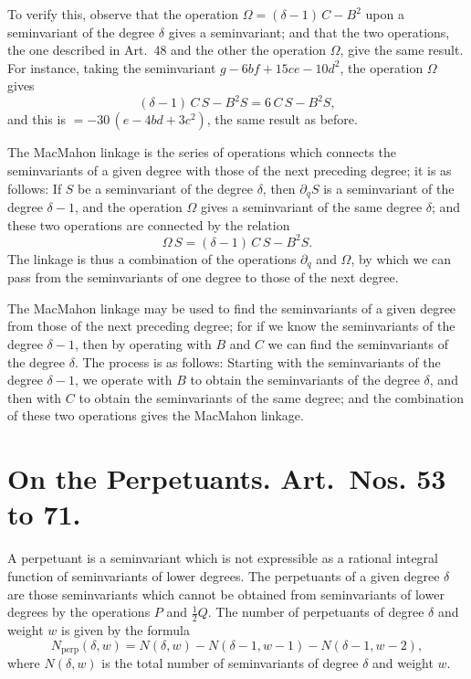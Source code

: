 \documentclass[11pt,a4paper]{book}
\begin{document}
\setcounter{art}{50}
\begin{art}
To verify this, observe that the operation $\Omega = (\delta - 1)\,C - B^{2}$ upon a seminvariant of the degree $\delta$ gives a seminvariant; and that the two operations, the one described in Art.~48 and the other the operation $\Omega$, give the same result. For instance, taking the seminvariant $g - 6bf + 15ce - 10d^{2}$, the operation $\Omega$ gives
\[
(\delta - 1)\,C\,S - B^{2}S = 6\,C\,S - B^{2}S,
\]
and this is $= -30\,(e - 4bd + 3c^{2})$, the same result as before.
\end{art}

\setcounter{art}{51}
\begin{art}
The MacMahon linkage is the series of operations which connects the seminvariants of a given degree with those of the next preceding degree; it is as follows: If $S$ be a seminvariant of the degree $\delta$, then $\partial_{q}S$ is a seminvariant of the degree $\delta - 1$, and the operation $\Omega$ gives a seminvariant of the same degree $\delta$; and these two operations are connected by the relation
\[
\Omega\,S = (\delta - 1)\,C\,S - B^{2}S.
\]
The linkage is thus a combination of the operations $\partial_{q}$ and $\Omega$, by which we can pass from the seminvariants of one degree to those of the next degree.
\end{art}

\setcounter{art}{52}
\begin{art}
The MacMahon linkage may be used to find the seminvariants of a given degree from those of the next preceding degree; for if we know the seminvariants of the degree $\delta - 1$, then by operating with $B$ and $C$ we can find the seminvariants of the degree $\delta$. The process is as follows: Starting with the seminvariants of the degree $\delta - 1$, we operate with $B$ to obtain the seminvariants of the degree $\delta$, and then with $C$ to obtain the seminvariants of the same degree; and the combination of these two operations gives the MacMahon linkage.
\end{art}

\section*{On the Perpetuants. Art.~Nos. \textbf{53} to \textbf{71}.}

\setcounter{art}{52}
\begin{art}
A perpetuant is a seminvariant which is not expressible as a rational integral function of seminvariants of lower degrees. The perpetuants of a given degree $\delta$ are those seminvariants which cannot be obtained from seminvariants of lower degrees by the operations $P$ and $\frac{1}{2}Q$. The number of perpetuants of degree $\delta$ and weight $w$ is given by the formula
\[
N_{\text{perp}}(\delta, w) = N(\delta, w) - N(\delta - 1, w - 1) - N(\delta - 1, w - 2),
\]
where $N(\delta, w)$ is the total number of seminvariants of degree $\delta$ and weight $w$.
\end{art}
\end{document}
